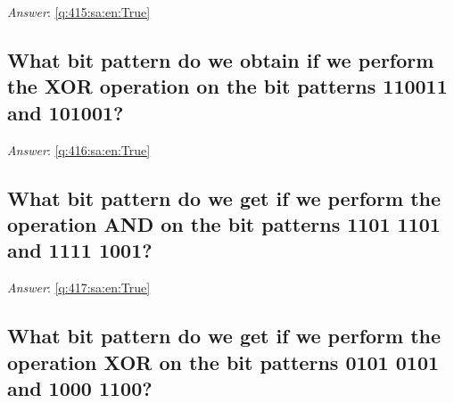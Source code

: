 \documentclass[a4paper,11pt,oneside]{article}
\begin{document}
\begin{sloppypar}
\label{q:415:sa:en:False}

\vspace{2cm}

\noindent\makebox[\textwidth]{\hrulefill}

\vspace{1cm}

\textit{Answer}: \autoref{q:415:sa:en:True}



\subsection{What bit pattern do we obtain if we perform the XOR operation on the bit patterns 110011 and 101001?}

\label{q:416:sa:en:False}

\vspace{2cm}

\noindent\makebox[\textwidth]{\hrulefill}

\vspace{1cm}

\textit{Answer}: \autoref{q:416:sa:en:True}



\subsection{What bit pattern do we get if we perform the operation AND on the bit patterns 1101 1101 and 1111 1001?}

\label{q:417:sa:en:False}

\vspace{2cm}

\noindent\makebox[\textwidth]{\hrulefill}

\vspace{1cm}

\textit{Answer}: \autoref{q:417:sa:en:True}



\subsection{What bit pattern do we get if we perform the operation XOR on the bit patterns 0101 0101 and 1000 1100?}

\label{q:418:sa:en:False}

\vspace{2cm}

\noindent\makebox[\textwidth]{\hrulefill}

\vspace{1cm}


\end{sloppypar}
\end{document}
